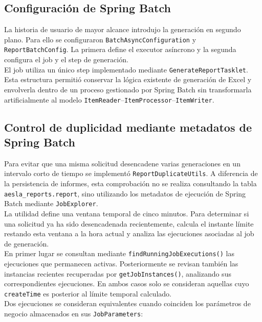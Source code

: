 \documentclass[11pt,a4paper,titlepage,oneside]{report}
\begin{document}
\subsection{Configuración de Spring Batch}

La historia de usuario de mayor alcance introdujo la generación en segundo
plano. Para ello se configuraron \texttt{BatchAsyncConfiguration} y
\texttt{ReportBatchConfig}. La primera define el executor asíncrono y la segunda
configura el job y el step de generación. \\

El job utiliza un único step implementado mediante
\texttt{GenerateReportTasklet}. Esta estructura permitió conservar la lógica
existente de generación de Excel y envolverla dentro de un proceso gestionado
por Spring Batch sin transformarla artificialmente al modelo
\texttt{ItemReader}--\texttt{ItemProcessor}--\texttt{ItemWriter}.

\subsection{Control de duplicidad mediante metadatos de Spring Batch}

Para evitar que una misma solicitud desencadene varias generaciones en un
intervalo corto de tiempo se implementó
\texttt{ReportDuplicateUtils}. A diferencia de la persistencia de informes,
esta comprobación no se realiza consultando la tabla
\texttt{aesla\_reports.report}, sino utilizando los metadatos de ejecución de
Spring Batch mediante \texttt{JobExplorer}. \\

La utilidad define una ventana temporal de cinco minutos. Para determinar si
una solicitud ya ha sido desencadenada recientemente, calcula el instante
límite restando esta ventana a la hora actual y analiza las ejecuciones
asociadas al job de generación. \\

En primer lugar se consultan mediante
\texttt{findRunningJobExecutions()} las ejecuciones que permanecen activas.
Posteriormente se revisan también las instancias recientes recuperadas por
\texttt{getJobInstances()}, analizando sus correspondientes ejecuciones. En
ambos casos solo se consideran aquellas cuyo \texttt{createTime} es posterior
al límite temporal calculado.\\ 

Dos ejecuciones se consideran equivalentes cuando coinciden los parámetros de
negocio almacenados en sus \texttt{JobParameters}:
\end{document}
